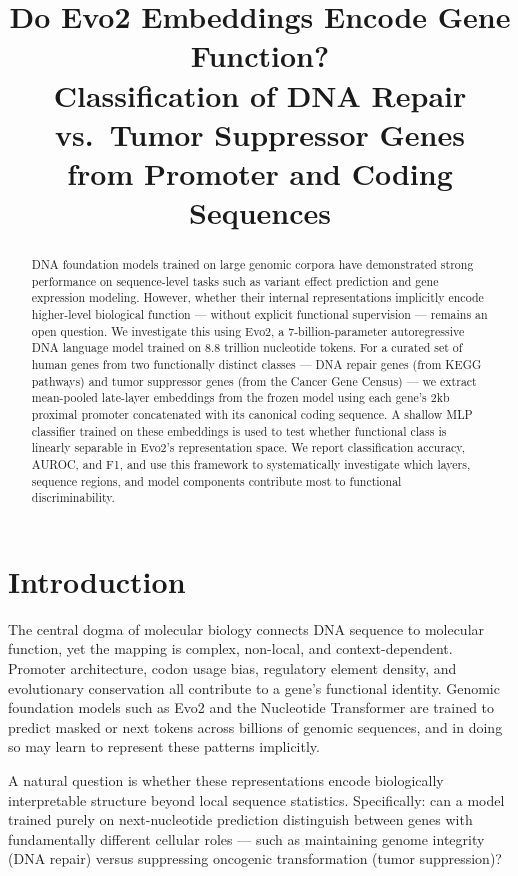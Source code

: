 \documentclass{article}
\title{Do Evo2 Embeddings Encode Gene Function? \\
Classification of DNA Repair vs.\ Tumor Suppressor Genes \\
from Promoter and Coding Sequences}
\begin{document}
\maketitle

\begin{abstract}
DNA foundation models trained on large genomic corpora have demonstrated strong performance on sequence-level tasks such as variant effect prediction and gene expression modeling. However, whether their internal representations implicitly encode higher-level biological function — without explicit functional supervision — remains an open question. We investigate this using Evo2, a 7-billion-parameter autoregressive DNA language model trained on 8.8 trillion nucleotide tokens. For a curated set of human genes from two functionally distinct classes — DNA repair genes (from KEGG pathways) and tumor suppressor genes (from the Cancer Gene Census) — we extract mean-pooled late-layer embeddings from the frozen model using each gene's 2kb proximal promoter concatenated with its canonical coding sequence. A shallow MLP classifier trained on these embeddings is used to test whether functional class is linearly separable in Evo2's representation space. We report classification accuracy, AUROC, and F1, and use this framework to systematically investigate which layers, sequence regions, and model components contribute most to functional discriminability.
\end{abstract}

\section{Introduction}
\label{sec:intro}

The central dogma of molecular biology connects DNA sequence to molecular function, yet the mapping is complex, non-local, and context-dependent. Promoter architecture, codon usage bias, regulatory element density, and evolutionary conservation all contribute to a gene's functional identity. Genomic foundation models such as Evo2 \citep{nguyen2024evo2} and the Nucleotide Transformer \citep{dalla2023nucleotide} are trained to predict masked or next tokens across billions of genomic sequences, and in doing so may learn to represent these patterns implicitly.

A natural question is whether these representations encode biologically interpretable structure beyond local sequence statistics. Specifically: can a model trained purely on next-nucleotide prediction distinguish between genes with fundamentally different cellular roles — such as maintaining genome integrity (DNA repair) versus suppressing oncogenic transformation (tumor suppression)?
\end{document}
